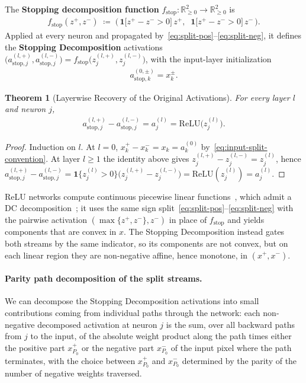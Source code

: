 \documentclass[twoside]{article}
\newcommand{\RR}{\mathbb{R}}
\newcommand{\relu}{\text{ReLU}}
\newcommand{\1}{\mathbf{1}}
\newtheorem{theorem}{Theorem}
\begin{document}
The \textbf{Stopping decomposition function} $f_{\mathrm{stop}} \colon \RR_{\ge 0}^2 \to \RR_{\ge
    0}^2$ is
\begin{align}\label{eq:stop-relu}
    f_{\mathrm{stop}}(z^+, z^-) \;\coloneqq\; \bigl(\,\1\!\bigl[z^+ - z^- > 0\bigr]\, z^+,\;\;
    \1\!\bigl[z^+ - z^- > 0\bigr]\, z^-\,\bigr).
\end{align}
Applied at every neuron and propagated by~\eqref{eq:split-pos}--\eqref{eq:split-neg}, it defines
the \textbf{Stopping Decomposition} activations $\bigl(a_{\mathrm{stop},j}^{(l,+)},
    a_{\mathrm{stop},j}^{(l,-)}\bigr) = f_{\mathrm{stop}}\bigl(z_j^{(l,+)}, z_j^{(l,-)}\bigr)$, with
the input-layer initialization
\begin{align}\label{eq:input-split-convention}
    a_{\mathrm{stop},k}^{(0,\pm)} = x_k^{\pm}.
\end{align}

\begin{theorem}[Layerwise Recovery of the Original Activations]\label{thm:decomp-recovery}
For every layer $l$ and neuron $j$,
\begin{align}\label{eq:decomp-recovery-stop-mix}
    a_{\mathrm{stop},j}^{(l,+)} - a_{\mathrm{stop},j}^{(l,-)}
    =
    a_j^{(l)} = \relu\!\bigl(z_j^{(l)}\bigr).
\end{align}
\end{theorem}

\begin{proof}
Induction on $l$. At $l=0$, $x_k^+ - x_k^- = x_k = a_k^{(0)}$ by~\eqref{eq:input-split-convention}.
At layer $l \ge 1$ the identity above gives $z_j^{(l,+)} - z_j^{(l,-)} = z_j^{(l)}$, hence
\(
    a_{\mathrm{stop},j}^{(l,+)} - a_{\mathrm{stop},j}^{(l,-)}
    = \1\{z_j^{(l)} > 0\}\bigl(z_j^{(l,+)} - z_j^{(l,-)}\bigr)
    = \relu(z_j^{(l)})
    = a_j^{(l)}.
\)
\end{proof}

ReLU networks compute continuous piecewise linear functions~\citep{Arora2018understanding}, which
admit a \ac{DC} decomposition~\citep{hiddenMono}; it uses the same sign
split~\eqref{eq:split-pos}--\eqref{eq:split-neg} with the pairwise activation $(\max\{z^+, z^-\},
    z^-)$ in place of $f_{\mathrm{stop}}$ and yields components that are convex in $x$. The Stopping
Decomposition instead gates both streams by the same indicator, so its components are not convex,
but on each linear region they are non-negative affine, hence monotone, in $(x^+, x^-)$.

\paragraph{Parity path decomposition of the split streams.}\label{app:parity-path}
We can decompose the Stopping Decomposition activations into small contributions coming from
individual paths through the network: each non-negative decomposed activation at neuron $j$ is the
sum, over all backward paths from $j$ to the input, of the absolute weight product along the path
times either the positive part $x_{P_0}^+$ or the negative part $x_{P_0}^-$ of the input pixel
where the path terminates, with the choice between $x_{P_0}^+$ and $x_{P_0}^-$ determined by the
parity of the number of negative weights traversed.
\end{document}
